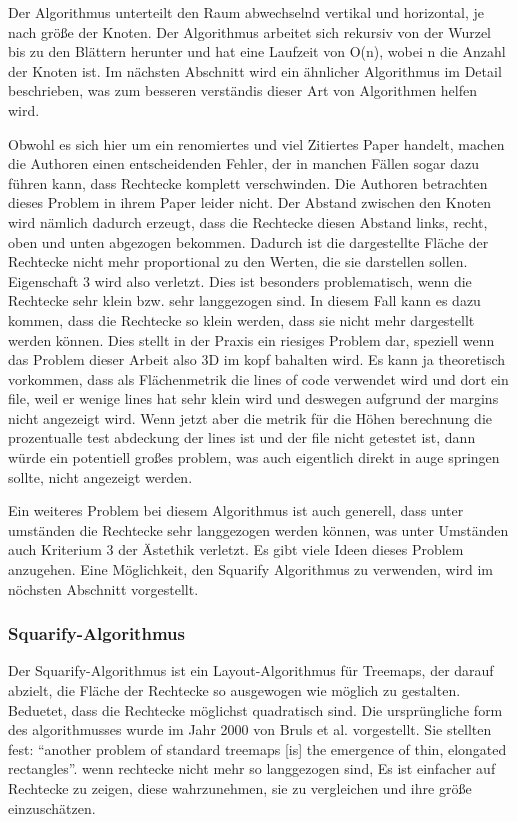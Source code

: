 Der Algorithmus unterteilt den Raum abwechselnd vertikal und horizontal, je nach größe der Knoten. Der Algorithmus arbeitet sich rekursiv von der Wurzel bis zu den Blättern herunter und hat eine Laufzeit von O(n), wobei n die Anzahl der Knoten ist. Im nächsten Abschnitt wird ein ähnlicher Algorithmus im Detail beschrieben, was zum besseren verständis dieser Art von Algorithmen helfen wird.

Obwohl es sich hier um ein renomiertes und viel Zitiertes Paper handelt, machen die Authoren einen entscheidenden Fehler, der in manchen Fällen sogar dazu führen kann, dass Rechtecke komplett verschwinden. Die Authoren betrachten dieses Problem in ihrem Paper leider nicht. 
Der Abstand zwischen den Knoten wird nämlich dadurch erzeugt, dass die Rechtecke diesen Abstand links, recht, oben und unten abgezogen bekommen. Dadurch ist die dargestellte Fläche der Rechtecke nicht mehr proportional zu den Werten, die sie darstellen sollen. Eigenschaft 3 wird also verletzt. Dies ist besonders problematisch, wenn die Rechtecke sehr klein bzw. sehr langgezogen sind. In diesem Fall kann es dazu kommen, dass die Rechtecke so klein werden, dass sie nicht mehr dargestellt werden können. Dies stellt in der Praxis ein riesiges Problem dar, speziell wenn das Problem dieser Arbeit also 3D im kopf bahalten wird. Es kann ja theoretisch vorkommen, dass als Flächenmetrik die lines of code verwendet wird und dort ein file, weil er wenige lines hat sehr klein wird und deswegen aufgrund der margins nicht angezeigt wird. Wenn jetzt aber die metrik für die Höhen berechnung die prozentualle test abdeckung der lines ist und der file nicht getestet ist, dann würde ein potentiell großes problem, was auch eigentlich direkt in auge springen sollte, nicht angezeigt werden. 

Ein weiteres Problem bei diesem Algorithmus ist auch generell, dass unter umständen die Rechtecke sehr langgezogen werden können, was unter Umständen auch Kriterium 3 der Ästethik verletzt. Es gibt viele Ideen dieses Problem anzugehen. Eine Möglichkeit, den Squarify Algorithmus zu verwenden, wird im nöchsten Abschnitt vorgestellt.

\subsubsection{Squarify-Algorithmus} \label{sec:Squarify}

Der Squarify-Algorithmus ist ein Layout-Algorithmus für Treemaps, der darauf abzielt, die Fläche der Rechtecke so ausgewogen wie möglich zu gestalten. Beduetet, dass die Rechtecke möglichst quadratisch sind. Die ursprüngliche form des algorithmusses wurde im Jahr 2000 von Bruls et al. \cite{bruls2000squarified} vorgestellt. Sie stellten fest: \enquote{another problem of standard treemaps [is] the emergence of thin, elongated rectangles}\cite[1]{bruls2000squarified}. wenn rechtecke nicht mehr so langgezogen sind, Es ist einfacher auf Rechtecke zu zeigen, diese wahrzunehmen, sie zu vergleichen und ihre größe einzuschätzen. 


